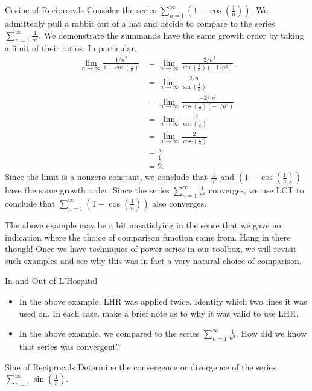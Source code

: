 \begin{example}{Cosine of Reciprocals}\label{rabbit}
Consider the series $\sum_{n=1}^\infty \left(1-\cos\left(\frac{1}{n}\right)\right)$. 
We admittedly pull a rabbit out of a hat and decide to compare to the series $\sum_{n=1}^\infty\frac{1}{n^2}$.  We demonstrate the summands have the same growth order by taking a limit of their ratios.  In particular,
\begin{align*}
\lim_{n\to\infty}\frac{1/n^2}{1-\cos\left(\frac{1}{n}\right)}&=\lim_{n\to\infty}\frac{-2/n^3}{\sin\left(\frac{1}{n}\right)\left(-1/n^2\right)} \\
&=\lim_{n\to\infty}\frac{2/n}{\sin\left(\frac{1}{n}\right)} \\
&=\lim_{n\to\infty}\frac{-2/n^2}{\cos\left(\frac{1}{n}\right)\left(-1/n^2\right)} \\
&=\lim_{n\to\infty}\frac{-2}{\cos\left(\frac{1}{n}\right)} \\
&=\lim_{n\to\infty}\frac{2}{\cos\left(\frac{1}{n}\right)} \\
&=\frac{2}{1}\\
&=2.
\end{align*}
Since the limit is a nonzero constant, we conclude that $\frac{1}{n^2}$ and $\left(1-\cos\left(\frac{1}{n}\right)\right)$ have the same growth order.  Since the series $\sum_{n=1}^\infty\frac{1}{n^2}$ converges, we use LCT to conclude that $\sum_{n=1}^\infty \left(1-\cos\left(\frac{1}{n}\right)\right)$ also converges. 
\end{example}
The above example may be a bit unsatisfying in the sense that we gave no indication where the choice of comparison function came from.  Hang in there though!  Once we have techniques of power series in our toolbox, we will revisit such examples and see why this was in fact a very natural choice of comparison.
\begin{exercise}{In and Out of L'Hospital \Coffeecup}
\begin{itemize}
\item In the above example, LHR was applied twice.  Identify which two lines it was used on.  In each case, make a brief note as to why it was valid to use LHR.  
\item In the above example, we compared to the series $\sum_{n=1}^\infty\frac{1}{n^2}$.  How did we know that series was convergent?
\vspace*{.2in}
\end{itemize}
\end{exercise}
\begin{exercise}{Sine of Reciprocals \Coffeecup \Coffeecup \Coffeecup}
Determine the convergence or divergence of the series $\sum_{n=1}^\infty \sin\left(\frac{1}{n}\right)$.

\vspace*{1.5in}

\end{exercise}
